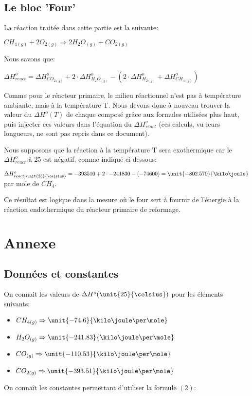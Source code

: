 \documentclass[11pt,a4paper]{report}
\begin{document}
\subsection*{Le bloc 'Four'}
La réaction traitée dans cette partie est la suivante:

$CH_{4(g)} + 2O_{2(g)} \Rightarrow 2H_{2}O_{(g)} + CO_{2(g)}$

Nous savons que:

$\Delta H^o_{react} = \Delta H^o_{CO_{2(g)}} + 2\cdot \Delta H^o_{H_{2}O_{(g)}} - (2\cdot \Delta H^o_{H_{2(g)}} + \Delta H^o_{CH_{4(g)}}) $

Comme pour le réacteur primaire, le milieu réactionnel n'est pas à température ambiante, mais à la température T. Nous devons donc à nouveau trouver la valeur du $\Delta H^o(T)$ de chaque composé grâce aux formules utilisées plus haut, puis injecter ces valeurs dans l'équation du $\Delta H^o_{react}$ (ces calculs, vu leurs longueurs, ne sont pas repris dans ce document).

Nous supposons que la réaction à la température T sera exothermique car le $\Delta H^o_{react}$ à \unit{25}{\celsius} est négatif, comme indiqué ci-dessous:

$\Delta H^o_{react, \unit{25}{\celsius}} = -393510 + 2\cdot -241830 - (-74600) = \unit{-802.570}{\kilo\joule}$ par mole de $CH_4$.

Ce résultat est logique dans la mesure où le four sert à fournir de l'énergie à la réaction endothermique du réacteur primaire de reformage.
\section*{Annexe}
\subsection*{Données et constantes}
On connait les valeurs de $\Delta H^o (\unit{25}{\celsius})$ pour les éléments suivants:
\begin{itemize}
\item{$CH_{4(g)} \Rightarrow \unit{-74.6}{\kilo\joule\per\mole}$}
\item{$H_2O_{(g)} \Rightarrow \unit{-241.83}{\kilo\joule\per\mole}$}
\item{$CO_{(g)} \Rightarrow \unit{-110.53}{\kilo\joule\per\mole}$}
\item{$CO_{2(g)} \Rightarrow \unit{-393.51}{\kilo\joule\per\mole}$}
\end{itemize}

On connaît les constantes permettant d'utiliser la formule $(2)$:
\end{document}
